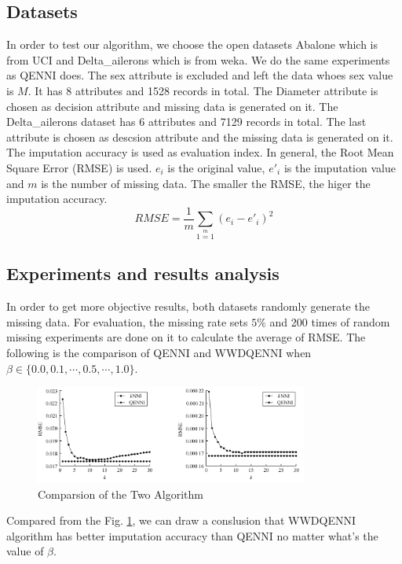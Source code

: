 \documentclass[print]{jicspack}
\begin{document}
\subsection{Datasets}
\label{sec:1.1}
In order to test our algorithm, we choose the open datasets Abalone which is from UCI and Delta\_ailerons which is from weka. We do the same experiments as QENNI does. The sex attribute is excluded and left the data whoes sex value is $M$. It has 8 attributes and 1528 records in total. The Diameter attribute is chosen as decision attribute and missing data is generated on it. The Delta\_ailerons dataset has 6 attributes and 7129 records in total. The last attribute is chosen as descsion attribute and the missing data is generated on it. The imputation accuracy is used as evaluation index. In general, the Root Mean Square Error (RMSE)\cite{RMSE} is used. $e_i$ is the original value, $e'_i$ is the imputation value and $m$ is the number of missing data. The smaller the RMSE, the higer the imputation accuracy.
\begin{equation}
\label{eq:6}
RMSE = \frac{1}{m}\sum\limits_{1=1}\limits^{m}(e_i - e'_i)^2
\end{equation}

\subsection{Experiments and results analysis}
In order to get more objective results, both datasets randomly generate the missing data. For evaluation, the missing rate sets $5\%$ and 200 times of random missing experiments are done on it to calculate the average of RMSE. The following is the comparison of QENNI and WWDQENNI when $\beta \in \{0.0, 0.1,\cdots,  0.5,\cdots, 1.0\}$.

\begin{figure}[h]
\centering
\includegraphics[angle=0, width=0.8\textwidth]{figure4.png}
\caption{Comparsion of the Two Algorithm}
\label{fig:figure4}
\end{figure}
Compared from the Fig. \ref{fig:figure4}, we can draw a conslusion that WWDQENNI algorithm has better imputation accuracy than QENNI no matter what's the value of $\beta$.
\end{document}

